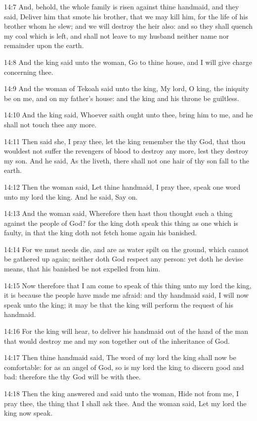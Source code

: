 14:7 And, behold, the whole family is risen against thine handmaid, and they said, Deliver him that smote his brother, that we may kill him, for the life of his brother whom he slew; and we will destroy the heir also: and so they shall quench my coal which is left, and shall not leave to my husband neither name nor remainder upon the earth.

14:8 And the king said unto the woman, Go to thine house, and I will give charge concerning thee.

14:9 And the woman of Tekoah said unto the king, My lord, O king, the iniquity be on me, and on my father's house: and the king and his throne be guiltless.

14:10 And the king said, Whoever saith ought unto thee, bring him to me, and he shall not touch thee any more.

14:11 Then said she, I pray thee, let the king remember the \LORD thy God, that thou wouldest not suffer the revengers of blood to destroy any more, lest they destroy my son. And he said, As the \LORD liveth, there shall not one hair of thy son fall to the earth.

14:12 Then the woman said, Let thine handmaid, I pray thee, speak one word unto my lord the king. And he said, Say on.

14:13 And the woman said, Wherefore then hast thou thought such a thing against the people of God? for the king doth speak this thing as one which is faulty, in that the king doth not fetch home again his banished.

14:14 For we must needs die, and are as water spilt on the ground, which cannot be gathered up again; neither doth God respect any person: yet doth he devise means, that his banished be not expelled from him.

14:15 Now therefore that I am come to speak of this thing unto my lord the king, it is because the people have made me afraid: and thy handmaid said, I will now speak unto the king; it may be that the king will perform the request of his handmaid.

14:16 For the king will hear, to deliver his handmaid out of the hand of the man that would destroy me and my son together out of the inheritance of God.

14:17 Then thine handmaid said, The word of my lord the king shall now be comfortable: for as an angel of God, so is my lord the king to discern good and bad: therefore the \LORD thy God will be with thee.

14:18 Then the king answered and said unto the woman, Hide not from me, I pray thee, the thing that I shall ask thee. And the woman said, Let my lord the king now speak.

